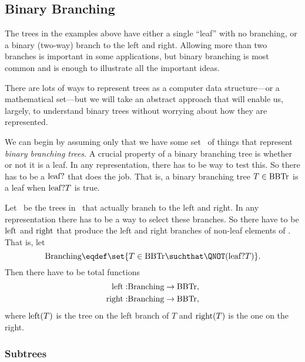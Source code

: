 \subsection{Binary Branching}

The trees in the examples above have either a single ``leaf'' with no
branching, or a binary (two-way) branch to the left and right.
Allowing more than two branches is important in some applications, but
binary branching is most common and is enough to illustrate all the
important ideas.

There are lots of ways to represent trees as a computer data
structure---or a mathematical set---but we will take an abstract
approach that will enable us, largely, to understand binary trees
without worrying about how they are represented.

We can begin by assuming only that we have some set \brnch\ of things
that represent \emph{binary branching trees}.  A crucial property of a
binary branching tree is whether or not it is a leaf.  In any
representation, there has to be way to test this.  So there has to be
a  $\leafp{}$ that does the job.  That is, a
binary branching tree $T \in \text{BBTr}$ is a leaf when $\text{leaf?}T$ is
true.

\iffalse
 We define the
\term{leaves} to be elements that $\leafp{}$ picks out:
\[
\leafset \eqdef \set{T \in \brnch \suchthat \leafp{(T)}}.
\]

So the official definition of ``leaf'' is ``element of the set \leafset.''
\fi

Let \brnchng\ be the trees in \brnch\ that actually branch to the left
and right.  In any representation there has to be a way to select
these branches.  So there have to be 
$\text{left}$ and $\text{right}$ that produce the left and right
branches of non-leaf elements of \brnch.  That is, let
\[
\brnchng \eqdef \set{T \in \brnch \suchthat \QNOT(\leafp{T})}.
\]
Then there have to be total functions
\begin{align*}
\text{left}: & \text{Branching} \to \text{BBTr},\\
\text{right}:& \text{Branching} \to \text{BBTr},
\end{align*}
where $\text{left}(T)$ is the tree on the left branch of $T$ and
$\text{right}(T)$ is the one on the right.

\subsubsection{Subtrees}

